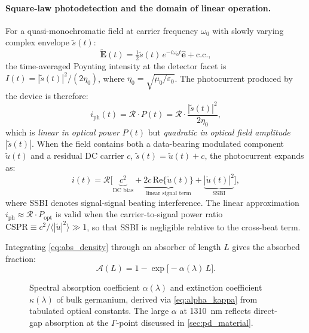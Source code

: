 \paragraph{Square-law photodetection and the domain of linear operation.}
For a quasi-monochromatic field at carrier frequency $\omega_0$ with slowly
varying complex envelope $\tilde{s}(t)$:
\begin{equation}
    \tilde{\mathbf{E}}(t)
    = \tfrac{1}{2}\tilde{s}(t)\,e^{-i\omega_0 t}\hat{\mathbf{e}} + \mathrm{c.c.},
    \label{eq:envelope_field}
\end{equation}
the time-averaged Poynting intensity at the detector facet is
$I(t)=|\tilde{s}(t)|^2/(2\eta_0)$, where $\eta_0=\sqrt{\mu_0/\varepsilon_0}$.
The photocurrent produced by the device is therefore:
\begin{equation}
    i_{\mathrm{ph}}(t)
    = \mathcal{R}\cdot P(t)
    = \mathcal{R}\cdot\frac{|\tilde{s}(t)|^2}{2\eta_0},
    \label{eq:square_law}
\end{equation}
which is \emph{linear in optical power} $P(t)$ but \emph{quadratic in optical
field amplitude} $|\tilde{s}(t)|$. When the field contains both a
data-bearing modulated component $\tilde{u}(t)$ and a residual DC carrier $c$,
$\tilde{s}(t)=\tilde{u}(t)+c$, the photocurrent expands as:
\begin{equation}
    i(t) = \mathcal{R}\bigl[
        \underbrace{c^2}_{\text{DC bias}}
       +\underbrace{2c\,\mathrm{Re}\{\tilde{u}(t)\}}_{\text{linear signal term}}
       +\underbrace{|\tilde{u}(t)|^2}_{\text{SSBI}}
    \bigr],
    \label{eq:square_law_expand}
\end{equation}
where SSBI denotes signal-signal beating interference. The linear approximation
$i_{\mathrm{ph}}\approx\mathcal{R}\cdot P_{\mathrm{opt}}$ is valid when the
carrier-to-signal power ratio
$\mathrm{CSPR}\equiv c^2/\langle|\tilde{u}|^2\rangle\gg1$,
so that SSBI is negligible relative to the cross-beat term.

Integrating \cref{eq:abs_density} through an absorber of length $L$ gives the
absorbed fraction:
\begin{equation}
    \mathcal{A}(L) = 1 - \exp\!\bigl[-\alpha(\lambda)\,L\bigr].
    \label{eq:abs_fraction}
\end{equation}

\begin{figure}[H]
    \centering
    \caption{Spectral absorption coefficient $\alpha(\lambda)$ and extinction
    coefficient $\kappa(\lambda)$ of bulk germanium, derived via
    \cref{eq:alpha_kappa} from tabulated optical constants. The large $\alpha$
    at \SI{1310}{\nano\metre} reflects direct-gap absorption at the
    $\Gamma$-point discussed in \cref{sec:pd_material}.}
    \label{fig:alpha_kappa}
\end{figure}


